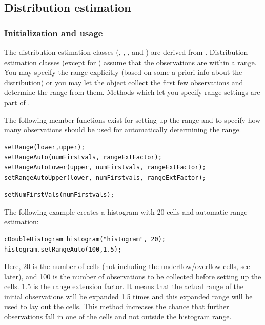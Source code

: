 \subsection{Distribution estimation}

\subsubsection{Initialization and usage}


The distribution estimation classes
(, , ,
 and ) are derived from
. Distribution estimation classes (except for
) assume that the observations are within a range.
You may specify the range explicitly (based on some a-priori info
about the distribution) or you may let the object collect the first
few observations and determine the range from them. Methods which let
you specify range settings are part of .

The following member functions exist for setting up the range
and to specify how many observations should be used for
automatically determining the range.

\begin{verbatim}
setRange(lower,upper);
setRangeAuto(numFirstvals, rangeExtFactor);
setRangeAutoLower(upper, numFirstvals, rangeExtFactor);
setRangeAutoUpper(lower, numFirstvals, rangeExtFactor);
\end{verbatim}

\begin{verbatim}
setNumFirstVals(numFirstvals);
\end{verbatim}

The following example creates a histogram with 20 cells and automatic
range estimation:

\begin{verbatim}
cDoubleHistogram histogram("histogram", 20);
histogram.setRangeAuto(100,1.5);
\end{verbatim}


Here, 20 is the number of cells (not including the underflow/overflow
cells, see later), and 100 is the number of observations to be
collected before setting up the cells. 1.5 is the range extension
factor. It means that the actual range of the initial observations
will be expanded 1.5 times and this expanded range will be used to lay
out the cells. This method increases the chance that further
observations fall in one of the cells and not outside the histogram
range.

